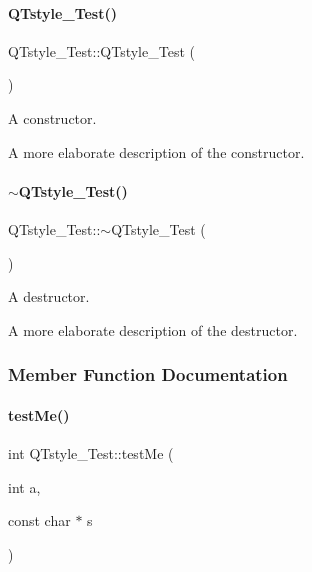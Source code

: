 \paragraph{\texorpdfstring{Q\+Tstyle\+\_\+\+Test()}{QTstyle\_Test()}}
{\footnotesize\ttfamily Q\+Tstyle\+\_\+\+Test\+::\+Q\+Tstyle\+\_\+\+Test (\begin{DoxyParamCaption}{ }\end{DoxyParamCaption})}



A constructor. 

A more elaborate description of the constructor. \hypertarget{class_q_tstyle___test_a7e82397d534d9a867f0857da01a46e9e}{}\label{class_q_tstyle___test_a7e82397d534d9a867f0857da01a46e9e} 
\paragraph{\texorpdfstring{$\sim$\+Q\+Tstyle\+\_\+\+Test()}{~QTstyle\_Test()}}
{\footnotesize\ttfamily Q\+Tstyle\+\_\+\+Test\+::$\sim$\+Q\+Tstyle\+\_\+\+Test (\begin{DoxyParamCaption}{ }\end{DoxyParamCaption})}



A destructor. 

A more elaborate description of the destructor. 

\subsubsection{Member Function Documentation}
\hypertarget{class_q_tstyle___test_a8840748753118dd468e8368a28e49c62}{}\label{class_q_tstyle___test_a8840748753118dd468e8368a28e49c62} 
\paragraph{\texorpdfstring{test\+Me()}{testMe()}}
{\footnotesize\ttfamily int Q\+Tstyle\+\_\+\+Test\+::test\+Me (\begin{DoxyParamCaption}\item[{int}]{a,  }\item[{const char $\ast$}]{s }\end{DoxyParamCaption})}



